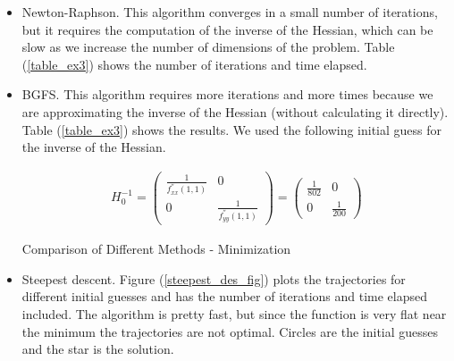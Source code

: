 \documentclass[a4paper,12pt]{article}
\begin{document}
    \begin{itemize}
        \item Newton-Raphson. This algorithm converges in a small number of iterations, but it requires the computation of the inverse of the Hessian, which can be slow as we increase the number of dimensions of the problem. Table (\ref{table_ex3}) shows the number of iterations and time elapsed. 
        
        
        \item BGFS. This algorithm requires more iterations and more times because we are approximating the inverse of the Hessian (without calculating it directly). Table (\ref{table_ex3}) shows the results. We used the following initial guess for the inverse of the Hessian. 
        
        \begin{align*}
            H^{-1}_0 = \begin{pmatrix} \frac{1}{f_{xx}^{''}(1,1)} & 0 \\ 0 & \frac{1}{f_{yy}^{''}(1,1)}  \end{pmatrix} = \begin{pmatrix} \frac{1}{802} & 0 \\ 0 & \frac{1}{200}  \end{pmatrix} 
        \end{align*}
        
        
        
    \begin{table}[!htbp]
        \centering
        \caption[Short Caption for LoT]{Comparison of Different Methods - Minimization}\label{table_ex3}
    \end{table}
        
        \item Steepest descent. Figure (\ref{steepest_des_fig}) plots the trajectories for different initial guesses and has the number of iterations and time elapsed included. The algorithm is pretty fast, but since the function is very flat near the minimum the trajectories are not optimal. Circles are the initial guesses and the star is the solution.   
        

\end{itemize}
\end{document}
